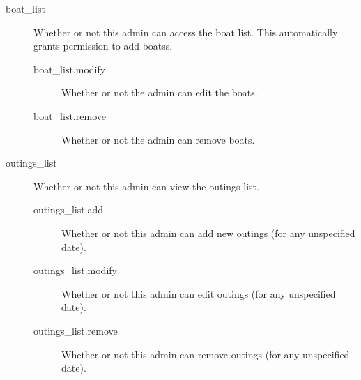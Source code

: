 \begin{description}
        \item [boat\_list] Whether or not this admin can access the boat list. This automatically grants permission to add boatss.
        \begin{description}
            \item [boat\_list.modify] Whether or not the admin can edit the boats.
            \item [boat\_list.remove] Whether or not the admin can remove boats.
        \end{description}
        
        \item [outings\_list] Whether or not this admin can view the outings list.
        \begin{description}
        	\item [outings\_list.add] Whether or not this admin can add new outings (for any unspecified date).
        	\item [outings\_list.modify] Whether or not this admin can edit outings (for any unspecified date).
        	\item [outings\_list.remove] Whether or not this admin can remove outings (for any unspecified date).
        \end{description}
    \end{description}